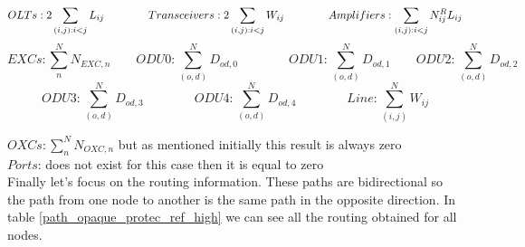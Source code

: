 \begin{equation*}
 OLTs: 2 \sum_{(i,j):i<j}L_{ij} \qquad \qquad
 Transceivers: 2 \sum_{(i,j):i<j}W_{ij} \qquad \qquad
 Amplifiers: \sum_{(i,j):i<j}N^R_{ij} L_{ij} \\
\end{equation*}
\begin{equation*}
 EXCs: \sum_n^N N_{EXC,n} \qquad
 ODU0: \sum_{(o,d)}^{N}D_{od,0} \qquad \qquad
 ODU1: \sum_{(o,d)}^{N}D_{od,1} \qquad
 ODU2: \sum_{(o,d)}^{N}D_{od,2}
\end{equation*}
\begin{equation*}
 ODU3: \sum_{(o,d)}^{N}D_{od,3} \qquad \qquad
 ODU4: \sum_{(o,d)}^{N}D_{od,4} \qquad \qquad
 Line: \sum_{(i,j)}^{N}W_{ij}
\end{equation*}

\vspace{13pt}
$OXCs: \sum_n^N N_{OXC,n}$ but as mentioned initially this result is always zero \\

$Ports$: does not exist for this case then it is equal to zero \\

Finally let's focus on the routing information. These paths are bidirectional so the path from one node to another is the same path in the opposite direction. In table \ref{path_opaque_protec_ref_high} we can see all the routing obtained for all nodes.

